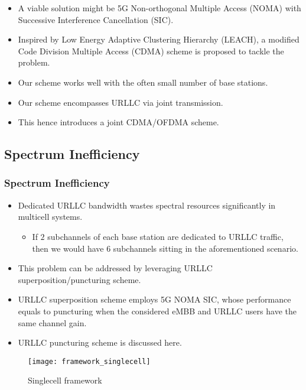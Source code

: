\begin{frame}
  \begin{itemize}
    \item A viable solution might be 5G Non-orthogonal Multiple Access (NOMA) with Successive Interference Cancellation (SIC). %
    \item Inspired by Low Energy Adaptive Clustering Hierarchy (LEACH), a modified Code Division Multiple Access (CDMA) scheme is proposed to tackle the problem\exampleFootnote.
  \end{itemize}
\end{frame}

\begin{frame}
  \begin{itemize}
    \item Our scheme works well with the often small number of base stations.
    \item Our scheme encompasses URLLC  via joint transmission.
    \item This hence introduces a joint CDMA/OFDMA scheme.
  \end{itemize}
\end{frame}

\subsection{Spectrum Inefficiency}
\begin{frame}
  \frametitle{Spectrum Inefficiency}
  \begin{itemize}
    \item Dedicated URLLC bandwidth wastes spectral resources significantly in multicell systems.
      \begin{itemize}
        \item If $2$ subchannels of each base station are dedicated to URLLC traffic, then we would have $6$ subchannels sitting  in the aforementioned scenario.
      \end{itemize}
  \end{itemize}
\end{frame}

\begin{frame}
  \begin{itemize}
    \item This problem can be addressed by leveraging URLLC superposition/puncturing scheme. %
    \item URLLC superposition scheme employs 5G NOMA SIC, whose performance equals to puncturing when the considered eMBB and URLLC users have the same channel gain. %
    \item URLLC puncturing scheme is discussed here.
  \end{itemize}
\end{frame}

\begin{frame}
  \begin{figure}
    \texttt{[image: framework\_singlecell]}
    \caption{Singlecell framework}
  \end{figure}
\end{frame}
